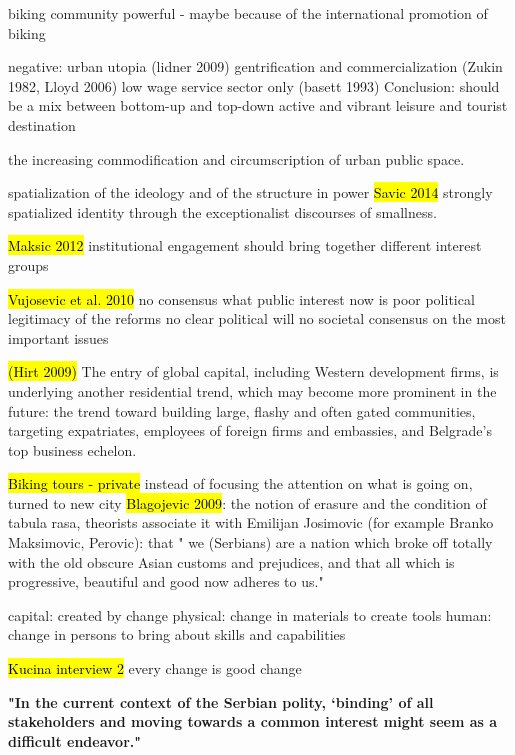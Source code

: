 \documentclass[11pt]{report}
\begin{document}
biking community powerful - maybe because of the international promotion of biking

negative:
urban utopia (lidner 2009)
gentrification and commercialization (Zukin 1982, Lloyd 2006)
low wage service sector only (basett 1993)
Conclusion:
should be a mix between bottom-up and top-down
active and vibrant leisure and tourist destination

\cite{Lehrer and Laidley 2008}
the increasing commodification and circumscription of urban public space.  

spatialization of the ideology and of the structure in power
\hl{Savic 2014}
strongly spatialized identity through the exceptionalist discourses of smallness. 
    
\hl{Maksic 2012}
institutional engagement should bring together different interest groups

\hl{Vujosevic et al. 2010}
no consensus what public interest now is
    poor political legitimacy of the  reforms
    no clear political will
    no societal consensus on the most important issues

\hl{(Hirt 2009)}
The entry of global capital, including Western development firms, is underlying another residential trend, which may become more prominent in the future: the trend toward building large, flashy and often gated communities, targeting expatriates, employees of foreign firms and embassies, and Belgrade’s top business echelon.

\hl{Biking tours - private}
instead of focusing the attention on what is going on, turned to new city
\hl{Blagojevic 2009}: 
the notion of erasure and the condition of  tabula rasa, theorists associate it with Emilijan Josimovic (for example Branko Maksimovic, Perovic): that " we (Serbians) are a nation which broke off totally with the old obscure Asian customs and prejudices, and that all which is progressive, beautiful and good now adheres to us."

\cite{Coleman 1988}
capital: created by change
    physical: change in materials to create tools
    human: change in persons to bring about skills and capabilities

\hl{Kucina interview 2}
every change is good change

\textbf{"In the current context  of  the  Serbian  polity,  ‘binding’  of  all stakeholders  and  moving  towards  a  common interest  might  seem  as  a  difficult  endeavor." \cite{Volic et al, 2012}}

\end{document}
